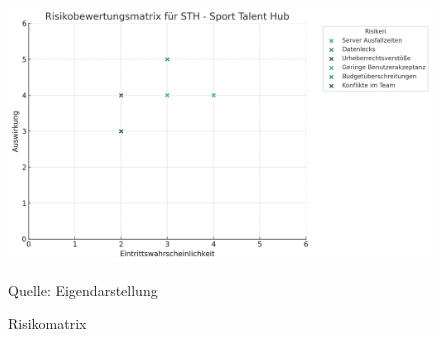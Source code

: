\begin{figure}[H]
	\caption[Risikomatrix]{Risikomatrix}
	\centering
	\includegraphics[width=1\textwidth]{assets/figures/risikomatrix.png}
    \begin{flushleft}
		Quelle: Eigendarstellung
	\end{flushleft}
\end{figure}

